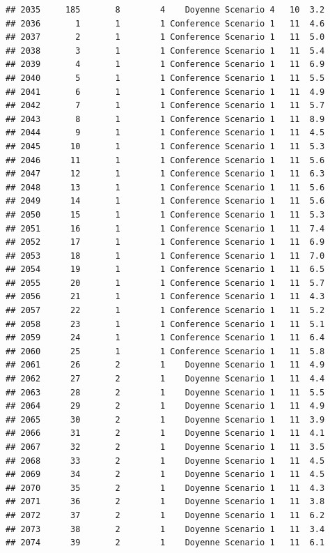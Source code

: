 \documentclass[
]{article}
\begin{document}
\begin{verbatim}
## 2035     185       8        4    Doyenne Scenario 4   10  3.2
## 2036       1       1        1 Conference Scenario 1   11  4.6
## 2037       2       1        1 Conference Scenario 1   11  5.0
## 2038       3       1        1 Conference Scenario 1   11  5.4
## 2039       4       1        1 Conference Scenario 1   11  6.9
## 2040       5       1        1 Conference Scenario 1   11  5.5
## 2041       6       1        1 Conference Scenario 1   11  4.9
## 2042       7       1        1 Conference Scenario 1   11  5.7
## 2043       8       1        1 Conference Scenario 1   11  8.9
## 2044       9       1        1 Conference Scenario 1   11  4.5
## 2045      10       1        1 Conference Scenario 1   11  5.3
## 2046      11       1        1 Conference Scenario 1   11  5.6
## 2047      12       1        1 Conference Scenario 1   11  6.3
## 2048      13       1        1 Conference Scenario 1   11  5.6
## 2049      14       1        1 Conference Scenario 1   11  5.6
## 2050      15       1        1 Conference Scenario 1   11  5.3
## 2051      16       1        1 Conference Scenario 1   11  7.4
## 2052      17       1        1 Conference Scenario 1   11  6.9
## 2053      18       1        1 Conference Scenario 1   11  7.0
## 2054      19       1        1 Conference Scenario 1   11  6.5
## 2055      20       1        1 Conference Scenario 1   11  5.7
## 2056      21       1        1 Conference Scenario 1   11  4.3
## 2057      22       1        1 Conference Scenario 1   11  5.2
## 2058      23       1        1 Conference Scenario 1   11  5.1
## 2059      24       1        1 Conference Scenario 1   11  6.4
## 2060      25       1        1 Conference Scenario 1   11  5.8
## 2061      26       2        1    Doyenne Scenario 1   11  4.9
## 2062      27       2        1    Doyenne Scenario 1   11  4.4
## 2063      28       2        1    Doyenne Scenario 1   11  5.5
## 2064      29       2        1    Doyenne Scenario 1   11  4.9
## 2065      30       2        1    Doyenne Scenario 1   11  3.9
## 2066      31       2        1    Doyenne Scenario 1   11  4.1
## 2067      32       2        1    Doyenne Scenario 1   11  3.5
## 2068      33       2        1    Doyenne Scenario 1   11  4.5
## 2069      34       2        1    Doyenne Scenario 1   11  4.5
## 2070      35       2        1    Doyenne Scenario 1   11  4.3
## 2071      36       2        1    Doyenne Scenario 1   11  3.8
## 2072      37       2        1    Doyenne Scenario 1   11  6.2
## 2073      38       2        1    Doyenne Scenario 1   11  3.4
## 2074      39       2        1    Doyenne Scenario 1   11  6.1

\end{verbatim}
\end{document}
